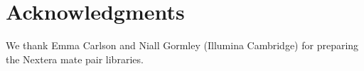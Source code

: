 \documentclass[fleqn,10pt]{wlpeerj}
\begin{document}
\section*{Acknowledgments}
We thank Emma Carlson and Niall Gormley (Illumina Cambridge) for preparing the Nextera mate pair libraries.




%
\end{document}
